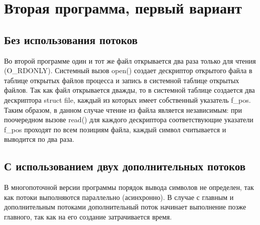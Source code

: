 
\clearpage

\section{Вторая программа, первый вариант}

\subsection{Без использования потоков}



Во второй программе один и тот же файл открывается два раза только для чтения (O\_RDONLY).
Системный вызов open() создает дескриптор открытого файла в таблице открытых файлов процесса и запись в системной таблице открытых файлов.
Так как файл открывается дважды, то в системной таблице создается два дескриптора struct file, каждый из которых имеет собственный указатель f\_pos.
Таким образом, в данном случае чтение из файла является независимым: при поочередном вызове read() для каждого дескриптора соответствующие указатели f\_pos проходят по всем позициям файла, каждый символ считывается и выводится по два раза.


\clearpage

\subsection{С использованием двух дополнительных потоков}


\clearpage


В многопоточной версии программы порядок вывода символов не определен, так как потоки выполняются параллельно (асинхронно).
В случае с главным и дополнительным потоками дополнительный поток начинает выполнение позже главного, так как на его создание затрачивается время.

